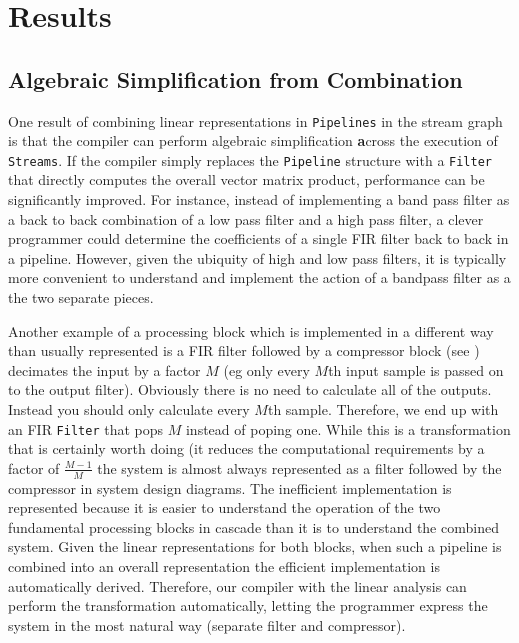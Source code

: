 \section{Results}

\subsection{Algebraic Simplification from Combination}
One result of combining linear representations in {\tt Pipelines} in the stream graph is that  
the compiler can perform algebraic simplification {\textbf across} the execution of {\tt Streams}. 
If the compiler simply replaces the {\tt Pipeline} structure with a {\tt Filter} that 
directly computes the overall vector matrix product, performance can be significantly improved.
For instance, instead of implementing a band pass filter as a back to back combination
of a low pass filter and a high pass filter, a clever programmer could determine the coefficients 
of a single FIR filter back to back in a pipeline. However, given the ubiquity of high and 
low pass filters, it is typically more convenient to understand and implement the action
of a bandpass filter as a the two separate pieces.

Another example of a processing block which is implemented in a different way than
usually represented is a FIR filter followed by a compressor block 
(see \cite{oppenheim-discrete}) decimates the input by a factor $M$ (eg only every $M$th 
input sample is passed on to the output filter). 
Obviously there is no need to calculate all of the outputs. 
Instead you should only calculate every $M$th sample.
Therefore, we end up with an FIR {\tt Filter} that pops $M$ instead of poping one. While
this is a transformation that is certainly worth doing (it reduces the computational
requirements by a factor of $\frac{M-1}{M}$ the system is almost always represented
as a filter followed by the compressor in system design diagrams. The inefficient
implementation is represented because it is easier to understand the operation of the
two fundamental processing blocks in cascade than it is to understand the combined system.
Given the linear representations for both blocks, when such a pipeline is combined into an
overall representation the efficient implementation is automatically derived. Therefore,
our compiler with the linear analysis can perform the transformation automatically, 
letting the programmer express the system in the most natural way (separate filter and compressor).

